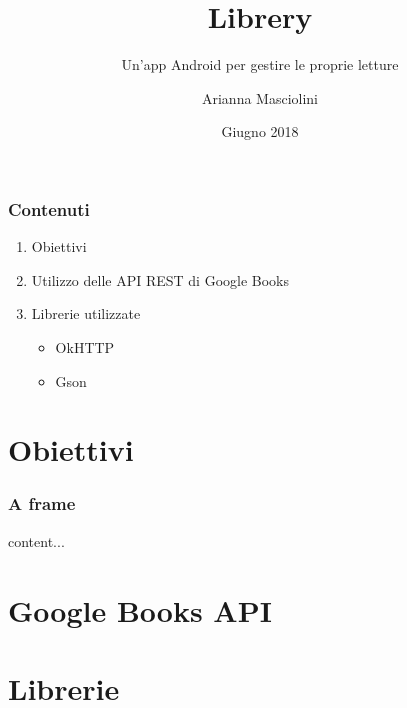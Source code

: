 \documentclass{beamer}
\title{Libre\textcolor{ProgBarBGColor}{ry}}
\subtitle{Un'app Android per gestire le proprie letture}
\author{Arianna Masciolini}
\institute{Università degli Studi di Perugia}
\date{Giugno 2018}
\begin{document}
	\setcounter{showProgressBar}{0}
	\setcounter{showSlideNumbers}{0}

	\frame{\titlepage}

	\begin{frame}
		\frametitle{Contenuti}
		\begin{enumerate}
			\item Obiettivi
			\item Utilizzo delle API REST di Google Books
			\item Librerie utilizzate
			\begin{itemize}
				\item OkHTTP
				\item Gson
			\end{itemize}
		\end{enumerate}
	\end{frame}

	\setcounter{framenumber}{0}
	\setcounter{showProgressBar}{1}
	\setcounter{showSlideNumbers}{1}
	\section{Obiettivi}
	\begin{frame}
		\frametitle{A frame}
		content...
	\end{frame}
\section{Google Books API}
\section{Librerie}
\end{document}
